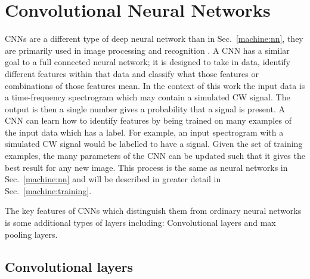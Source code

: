 \section{\label{machine:cnn}Convolutional Neural Networks}

\glspl{CNN} are a different type of deep neural network than in Sec.~\ref{machine:nn}, they are primarily used in image processing and recognition
\cite{lecun2015DeepLearning,lecun1998GradientbasedLearning,waibel1989PhonemeRecognition,krizhevsky2012ImageNetClassificationa}.
A \gls{CNN} has a similar goal to a full connected neural network; it is designed to take in data, identify different features within that data and classify what those features or combinations of those features mean.
In the context of this work the input data is a time-frequency spectrogram which may contain a simulated \gls{CW} signal.
The output is then a single number gives a probability that a signal is present.
A \gls{CNN} can learn how to identify features by being trained on many
examples of the input data which has a label.
For example, an input spectrogram with a simulated \gls{CW} signal would be labelled to have a signal.
Given the set of training examples, the many parameters of the \gls{CNN} can
be updated such that it gives the best result for any new image. 
This process is the same as neural networks in Sec.~\ref{machine:nn} and will be described in greater detail in Sec.~\ref{machine:training}.

The key features of \glspl{CNN} which distinguish them from ordinary neural networks is some additional types of layers including: Convolutional layers and max pooling layers. 


\subsection{Convolutional layers}

